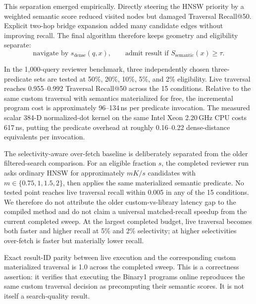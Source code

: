 This separation emerged empirically. Directly steering the HNSW priority by a weighted semantic score reduced visited nodes but damaged Traversal Recall@50. Explicit two-hop bridge expansion added many candidate edges without improving recall. The final algorithm therefore keeps geometry and eligibility separate:
\begin{equation}
\text{navigate by } s_{\mathrm{dense}}(q,x), \qquad
\text{admit result if } S_{\mathrm{semantic}}(x)\ge\tau.
\end{equation}

In the 1,000-query reviewer benchmark, three independently chosen three-predicate sets are tested at 50\%, 20\%, 10\%, 5\%, and 2\% eligibility. Live traversal reaches 0.955--0.992 Traversal Recall@50 across the 15 conditions. Relative to the same custom traversal with semantics materialized for free, the incremental program cost is approximately 96--134\,ns per predicate invocation. The measured scalar 384-D normalized-dot kernel on the same Intel Xeon 2.20\,GHz CPU costs 617\,ns, putting the predicate overhead at roughly 0.16--0.22 dense-distance equivalents per invocation.

The selectivity-aware over-fetch baseline is deliberately separated from the older  filtered-search comparison. For an eligible fraction $s$, the completed reviewer run asks ordinary HNSW for approximately $mK/s$ candidates with $m\in\{0.75,1,1.5,2\}$, then applies the same materialized semantic predicate. No tested point reaches live traversal recall within 0.005 in any of the 15 conditions. We therefore do not attribute the older custom-vs-library latency gap to the compiled method and do not claim a universal matched-recall speedup from the current completed sweep. At the largest completed budget, live traversal becomes both faster and higher recall at 5\% and 2\% selectivity; at higher selectivities over-fetch is faster but materially lower recall.

Exact result-ID parity between live execution and the corresponding custom materialized traversal is 1.0 across the completed sweep. This is a correctness assertion: it verifies that executing the Binary1 programs online reproduces the same custom traversal decision as precomputing their semantic scores. It is not itself a search-quality result.

